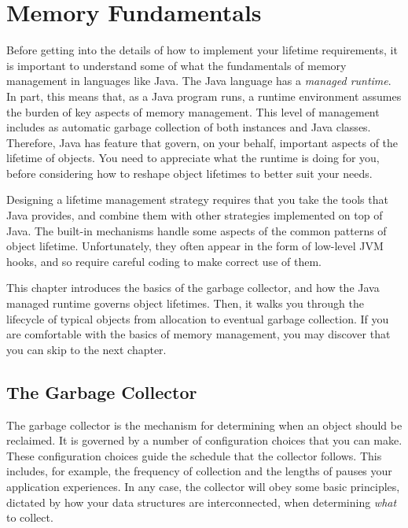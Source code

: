 
\chapter{Memory Fundamentals}

Before getting into the details of how to implement your lifetime requirements,
it is important to understand some of what the fundamentals of memory management
in languages like Java. The Java language has a \emph{managed runtime}. In part,
this means that, as a Java program runs, a runtime environment assumes the burden
of key aspects of memory management. This level of management includes as
automatic garbage collection of both instances and Java classes. Therefore, Java
has feature that govern, on your behalf, important aspects of the lifetime of
objects. You need to appreciate what the runtime is doing for you, before
considering how to reshape object lifetimes to better suit your needs.

Designing a lifetime management strategy requires that you take the tools that
Java provides, and combine them with other strategies implemented on top of Java.
The built-in mechanisms handle some aspects of the common patterns of object
lifetime. Unfortunately, they often appear in the form of low-level JVM hooks,
and so require careful coding to make correct use of them.

This chapter introduces the basics of the garbage collector, and how the Java
managed runtime governs object lifetimes. Then, it walks you through the
lifecycle of typical objects from allocation to eventual garbage collection. If
you are comfortable with the basics of memory management, you may discover that
you can skip to the next chapter.

\section{The Garbage Collector}
The garbage collector is the mechanism for determining when an object should be
reclaimed. It is governed by a number of configuration choices that you can make.
These configuration choices guide the schedule that the collector follows. This
includes, for example, the frequency of collection and the lengths of pauses your
application experiences. In any case, the collector will obey some basic
principles, dictated by how your data structures are interconnected, when
determining \emph{what} to collect.

